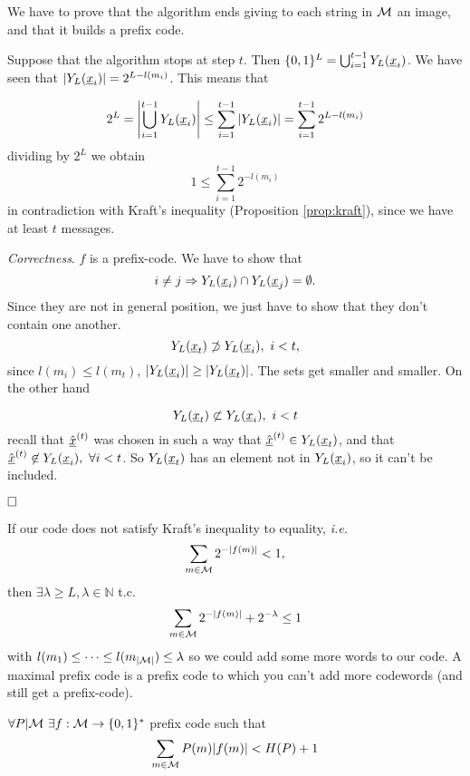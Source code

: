 We have to prove that the algorithm ends giving to each string in $\mathcal{M}$ an image, and that it builds a prefix code.

\noindent Suppose that the algorithm stops at step $t$. Then $\{0, 1\}^L = \bigcup_{i = 1}^{t-1}Y_L(\underline{x}_i)$. We have seen that $|Y_L(\underline{x}_i)| = 2^{L - l(m_i)}$. This means that

\[
2^L = \left|\bigcup_{i=1}^{t-1}Y_L(\underline{x}_i) \right| \leq \sum_{i=1}^{t-1}|Y_L(\underline{x}_i)| = \sum_{i=1}^{t-1} 2^{L-l(m_i)}
\]
dividing by $2^L$ we obtain
$$1 \leq \sum_{i=1}^{t-1}2^{-l(m_i)}$$
in contradiction with Kraft's inequality (Proposition \ref{prop:kraft}), since we have at least $t$ messages. 


\noindent\emph{Correctness}. $f$ is a prefix-code. We have to show that $$i \not= j \Rightarrow Y_L(\underline{x}_i) \cap Y_L(\underline{x}_j) = \emptyset.$$
Since they are not in general position, we just have to show that they don't contain one another. $$Y_L(\underline{x}_t) \not\supset Y_L(\underline{x}_i),\ i < t,$$ since $l(m_i) \leq l(m_t)$, $|Y_L(\underline{x}_i)| \geq |Y_L(\underline{x}_t)|$. The sets get smaller and smaller. On the other hand

$$Y_L(\underline{x}_t) \not\subset Y_L(\underline{x}_i),\ i < t$$
recall that $\hat{\underline{x}}^{(t)}$ was chosen in such a way that $\hat{\underline{x}}^{(t)} \in Y_L(\underline{x}_t)$, and that $\hat{\str{x}}^{(t)} \not\in \prol{\str{x}_i},\ \forall i < t$. So $Y_L(\underline{x}_t)$ has an element not in $Y_L(\underline{x}_i)$, so it can't be included.

$\hfill\Box$

If our code does not satisfy Kraft's inequality to equality, \emph{i.e.} $$\sum_{m\in\mathcal{M}}2^{-|f(m)|} < 1,$$ then $\exists \lambda \geq L, \lambda \in \mathbb{N}$ t.c. $$\sum_{m\in\mathcal{M}}2^{-|f(m)|} + 2^{-\lambda} \leq 1$$ with $l(m_1) \leq \cdots \leq l(m_{|\mathcal{M}|}) \leq \lambda$ so we could add some more words to our code. A maximal prefix code is a prefix code to which you can't add more codewords (and still get a prefix-code).

\begin{prop}
 $\forall P|\mathcal{M}\ \exists f:\mathcal{M} \rightarrow \{0, 1\}^*$ prefix code such that
 \begin{equation}
    \sum_{m\in \mathcal{M}} P(m)|f(m)| < H(P) + 1
 \end{equation}
\end{prop}


